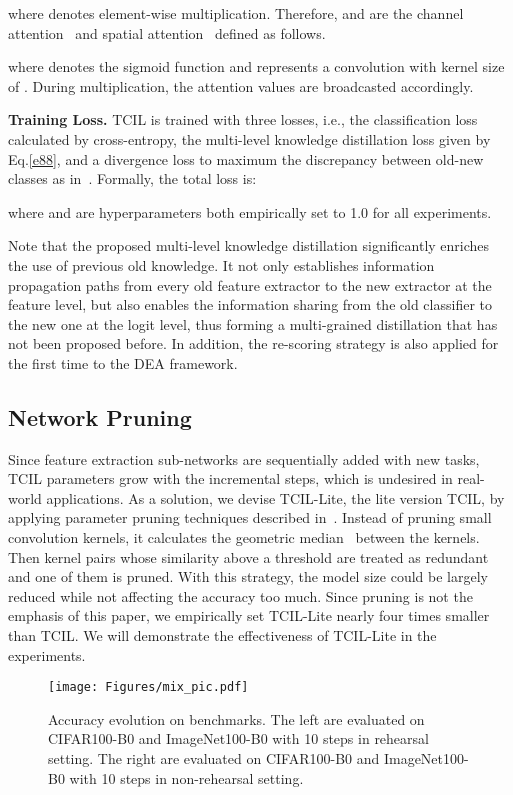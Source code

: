 \documentclass[letterpaper]{article} \usepackage{aaai23}  \usepackage{times}  \usepackage{helvet}  \usepackage{courier}  \usepackage[hyphens]{url}  \usepackage{graphicx} \urlstyle{rm} \def\UrlFont{\rm}  \usepackage{natbib}  \usepackage{caption} \frenchspacing  \setlength{\pdfpagewidth}{8.5in}  \setlength{\pdfpageheight}{11in}  \usepackage{algorithm}
\begin{document}
where  denotes element-wise multiplication. Therefore,  and  are the channel attention~\cite{c28, c0, e10} and spatial attention~\cite{c0, e11} defined as follows.


where  denotes the sigmoid function and  represents a convolution with kernel size of . During multiplication, the attention values are broadcasted accordingly.

\noindent\textbf{Training Loss.}
TCIL is trained with three losses, i.e., the classification loss  calculated by cross-entropy, the multi-level knowledge distillation loss given by Eq.\ref{e88}, and a divergence loss  to maximum the discrepancy between old-new classes as in~\cite{t70}. Formally, the total loss is:

where  and  are hyperparameters both empirically set to 1.0 for all experiments. 

Note that the proposed multi-level knowledge distillation significantly enriches the use of previous old knowledge. It not only establishes information propagation paths from every old feature extractor to the new extractor at the feature level, but also enables the information sharing from the old classifier to the new one at the logit level, thus forming a multi-grained distillation that has not been proposed before. In addition, the re-scoring strategy is also applied for the first time to the DEA framework.


\subsection{Network Pruning}
Since feature extraction sub-networks are sequentially added with new tasks, TCIL parameters grow with the incremental steps, which is undesired in real-world applications. As a solution, we devise TCIL-Lite, the lite version TCIL, by applying parameter pruning techniques described in~\cite{e12}. Instead of pruning small convolution kernels, it calculates the geometric median~\cite{e15} between the kernels. Then kernel pairs whose similarity above a threshold are treated as redundant and one of them is pruned. With this strategy, the model size could be largely reduced while not affecting the accuracy too much. Since pruning is not the emphasis of this paper, we empirically set TCIL-Lite nearly four times smaller than TCIL. We will demonstrate the effectiveness of TCIL-Lite in the experiments.



\begin{figure*}
\centering

\texttt{[image: Figures/mix\_pic.pdf]}

\caption{Accuracy evolution on benchmarks. The left are evaluated on CIFAR100-B0 and ImageNet100-B0 with 10 steps in rehearsal setting. The right are evaluated on CIFAR100-B0 and ImageNet100-B0 with 10 steps in non-rehearsal setting.}
\label{img2}
\end{figure*}
\end{document}

